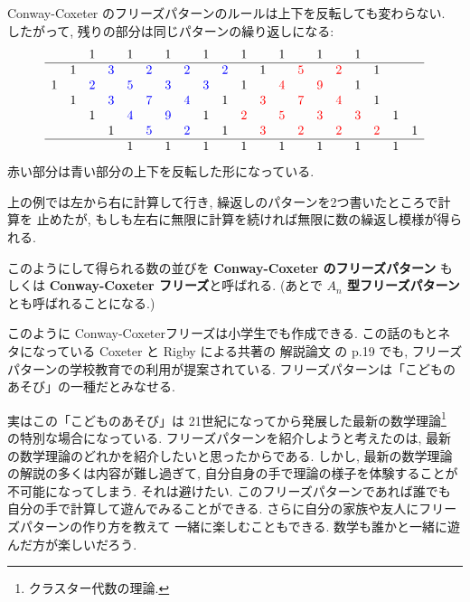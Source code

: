 \documentclass[12pt,twoside,dvipdfm]{jarticle}
\newcommand\red{\color{red}}
\newcommand\blue{\color{blue}}
\renewcommand\r{\red}
\renewcommand\b{\blue}
\theoremstyle{definition} %
\theoremstyle{definition} %
\theoremstyle{definition} %
\numberwithin{theorem}{section}
\numberwithin{equation}{section}
\numberwithin{figure}{section}
\numberwithin{table}{section}
\begin{document}
Conway-Coxeter のフリーズパターンのルールは上下を反転しても変わらない. \\
したがって, 残りの部分は同じパターンの繰り返しになる:
\begin{equation}
\begin{array}{cccccccccccccccccccc}
   &   & 1 &   & 1 &   & 1 &   & 1 &   & 1 &   & 1 &   & 1 &   & 1 &   &   &   \\ \hline
   & 1 &   &\b3&   &\b2&   &\b2&   &\b2&   & 1 &   &\r5&   &\r2&   & 1 &   &   \\
 1 &   &\b2&   &\b5&   &\b3&   &\b3&   & 1 &   &\r4&   &\r9&   & 1 &   &   &   \\
   & 1 &   &\b3&   &\b7&   &\b4&   & 1 &   &\r3&   &\r7&   &\r4&   & 1 &   &   \\
   &   & 1 &   &\b4&   &\b9&   & 1 &   &\r2&   &\r5&   &\r3&   &\r3&   & 1 &   \\
   &   &   & 1 &   &\b5&   &\b2&   & 1 &   &\r3&   &\r2&   &\r2&   &\r2&   & 1 \\ \hline
   &   &   &   & 1 &   & 1 &   & 1 &   & 1 &   & 1 &   & 1 &   & 1 &   & 1 &   \\
\end{array}
\label{eq:CCFA5}
\end{equation}
赤い部分は青い部分の上下を反転した形になっている.

上の例では左から右に計算して行き, 繰返しのパターンを2つ書いたところで計算を
止めたが, もしも左右に無限に計算を続ければ無限に数の繰返し模様が得られる.

このようにして得られる数の並びを {\bf Conway-Coxeter のフリーズパターン}
もしくは {\bf Conway-Coxeter フリーズ}と呼ばれる.
(あとで {\bf $A_n$ 型フリーズパターン}とも呼ばれることになる.)

このように Conway-Coxeterフリーズは小学生でも作成できる.
この話のもとネタになっている Coxeter と Rigby による共著の
解説論文 \cite{Coxeter-Rigby} の p.19 でも, 
フリーズパターンの学校教育での利用が提案されている.
フリーズパターンは「こどものあそび」の一種だとみなせる.

実はこの「こどものあそび」は 
21世紀になってから発展した最新の数学理論\footnote{クラスター代数の理論.}%
の特別な場合になっている.
フリーズパターンを紹介しようと考えたのは, 
最新の数学理論のどれかを紹介したいと思ったからである.
しかし, 最新の数学理論の解説の多くは内容が難し過ぎて, 
自分自身の手で理論の様子を体験することが不可能になってしまう. 
それは避けたい.
このフリーズパターンであれば誰でも自分の手で計算して遊んでみることができる.
さらに自分の家族や友人にフリーズパターンの作り方を教えて
一緒に楽しむこともできる.
数学も誰かと一緒に遊んだ方が楽しいだろう.
\end{document}
